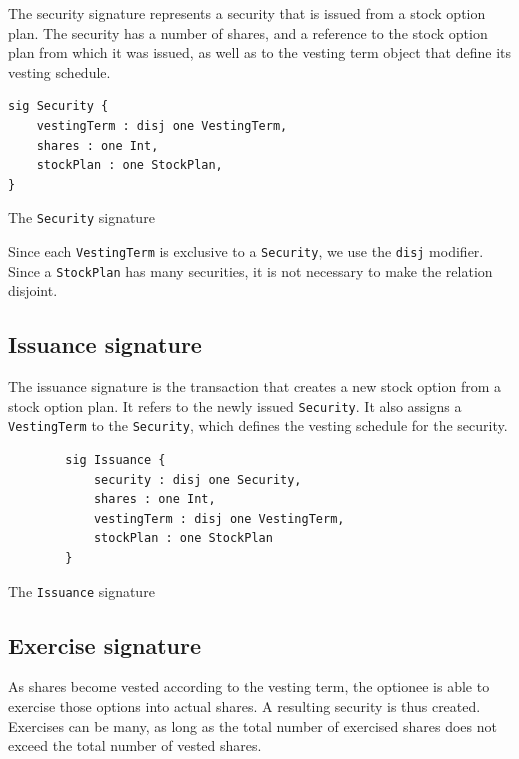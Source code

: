 The security signature represents a security that is issued from a stock option plan. The security has a number of shares, and a reference to the stock option plan from which it was issued, as well as to the vesting term object that define its vesting schedule.

\begin{listing}[!h]
\begin{verbatim}
sig Security {
    vestingTerm : disj one VestingTerm,
    shares : one Int,
    stockPlan : one StockPlan,
}
\end{verbatim}
\caption{The \texttt{Security} signature}
\label{lst:security-signature-2}
\end{listing}


Since each \verb|VestingTerm| is exclusive to a \verb|Security|, we use the \verb|disj| modifier. Since a \verb|StockPlan| has many securities, it is not necessary to make the relation disjoint.

\subsection{Issuance signature}

The issuance signature is the transaction that creates a new stock option from a stock option plan. It refers to the newly issued \verb|Security|. It also assigns a \verb|VestingTerm| to the \verb|Security|, which defines the vesting schedule for the security.

\noindent{}

\begin{listing}[!h]
\begin{verbatim}
		sig Issuance {
			security : disj one Security,
			shares : one Int,
			vestingTerm : disj one VestingTerm,
			stockPlan : one StockPlan
		}
\end{verbatim}
\caption{The \texttt{Issuance} signature}
\label{lst:issuance-signature-2}
\end{listing}


\subsection{Exercise signature}

As shares become vested according to the vesting term, the optionee is able to exercise those options into actual shares. A resulting security is thus created. Exercises can be many, as long as the total number of exercised shares does not exceed the total number of vested shares.

